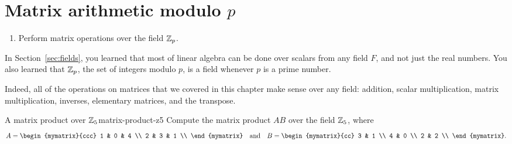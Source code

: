 \section{Matrix arithmetic modulo \texorpdfstring{$p$}{p}}

\begin{outcome}
  \begin{enumerate}
  \item Perform matrix operations over the field $\mathbb{Z}_p$.
  \end{enumerate}
\end{outcome}

In Section~\ref{sec:fields}, you learned that most of linear algebra
can be done over scalars from any field $F$, and not just the real
numbers. You also learned that $\mathbb{Z}_p$, the set of integers modulo $p$,
is a field whenever $p$ is a prime number.

Indeed, all of the operations on matrices that we covered in this
chapter make sense over any field: addition, scalar multiplication,
matrix multiplication, inverses, elementary matrices, and the
transpose.

\begin{example}{A matrix product over $\mathbb{Z}_5$}{matrix-product-z5}
  Compute the matrix product $AB$ over the field $\mathbb{Z}_5$, where
  \begin{equation*}
    A = \begin{mymatrix}{ccc}
      1 & 0 & 4 \\
      2 & 3 & 1 \\
    \end{mymatrix}
    \quad\mbox{and}\quad
    B = \begin{mymatrix}{cc}
      3 & 1 \\
      4 & 0 \\
      2 & 2 \\
    \end{mymatrix}.
  \end{equation*}
\end{example}

